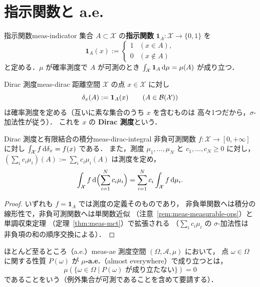 \section{指示関数と a.e.}

\begin{definition}{指示関数}{meas-indicator}
  集合 $A\subset \mathcal{X}$ の\textbf{指示関数} $\mathbf{1}_A\colon \mathcal{X}\to\{0,1\}$ を
  \[
    \mathbf{1}_A(x):=
    \begin{cases}
      1 & (x\in A),\\
      0 & (x\notin A)
    \end{cases}
  \]
  と定める．$\mu$ が確率測度で $A$ が可測のとき
  $\int_{\mathcal{X}}\mathbf{1}_A\,\mathrm{d}\mu=\mu(A)$ が成り立つ．
\end{definition}

\begin{definition}{Dirac 測度}{meas-dirac}
  距離空間 $\mathcal{X}$ の点 $x\in\mathcal{X}$ に対し
  \[
    \delta_x(A):=\mathbf{1}_A(x)
    \qquad(A\in\mathcal{B}(\mathcal{X}))
  \]
  は確率測度を定める（互いに素な集合のうち $x$ を含むものは
  高々1つだから，$\sigma$-加法性が従う）．
  これを $x$ の \textbf{Dirac 測度}という．
\end{definition}

\begin{claim}{Dirac 測度と有限結合の積分}{meas-dirac-integral}
  非負可測関数 $f\colon\mathcal{X}\to[0,+\infty]$ に対し
  $\int_{\mathcal{X}}f\,\mathrm{d}\delta_x=f(x)$ である．
  また，測度 $\mu_1,\dots,\mu_N$ と $c_1,\dots,c_N\geq0$ に対し，
  $(\sum_ic_i\mu_i)(A):=\sum_ic_i\mu_i(A)$ は測度を定め，
  \[
    \int_{\mathcal{X}}f\,\mathrm{d}\Bigl(\sum_{i=1}^Nc_i\mu_i\Bigr)
    =\sum_{i=1}^Nc_i\int_{\mathcal{X}}f\,\mathrm{d}\mu_i.
  \]
\end{claim}

\begin{proof}
  いずれも $f=\mathbf{1}_A$ では測度の定義そのものであり，
  非負単関数へは積分の線形性で，非負可測関数へは単関数近似
  （注意~\ref{rem:meas-measurable-ops}）と単調収束定理
  （定理~\ref{thm:meas-mct}）で拡張される
  （$\sum_ic_i\mu_i$ の $\sigma$-加法性は
  非負項の和の順序交換による）．
\end{proof}

\begin{definition}{ほとんど至るところ（a.e.）}{meas-ae}
  測度空間 $(\Omega,\mathcal{A},\mu)$ において，
  点 $\omega\in\Omega$ に関する性質 $P(\omega)$ が
  $\mu$\textbf{-a.e.}（almost everywhere）で成り立つとは，
  \[
    \mu(\{\omega\in\Omega\mid P(\omega)\text{ が成り立たない}\})=0
  \]
  であることをいう（例外集合が可測であることを含めて要請する）．
\end{definition}

